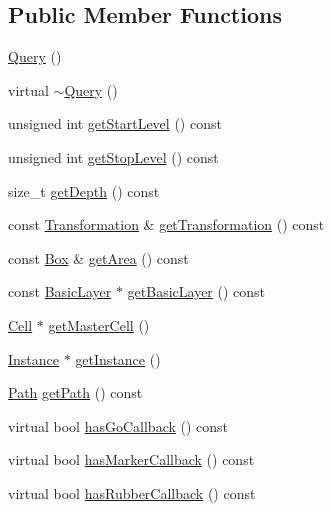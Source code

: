 \subsection*{Public Member Functions}
\begin{DoxyCompactItemize}
\item 
\hyperlink{classHurricane_1_1Query_a999eaaaf34672fb056df14629d3197d1}{Query} ()
\item 
virtual \hyperlink{classHurricane_1_1Query_acd18d98c6bf30dd049916508a397391a}{$\sim$\+Query} ()
\item 
unsigned int \hyperlink{classHurricane_1_1Query_a7aac7fbdc96df19e7249bf8993eb355f}{get\+Start\+Level} () const
\item 
unsigned int \hyperlink{classHurricane_1_1Query_a3544d22dbb0685208c590cef09412796}{get\+Stop\+Level} () const
\item 
size\+\_\+t \hyperlink{classHurricane_1_1Query_afb81080617e5b4d3c2bedf1bf8b2ebd8}{get\+Depth} () const
\item 
const \hyperlink{classHurricane_1_1Transformation}{Transformation} \& \hyperlink{classHurricane_1_1Query_aabe2c0588f95c30a3acfec8fed269be4}{get\+Transformation} () const
\item 
const \hyperlink{classHurricane_1_1Box}{Box} \& \hyperlink{classHurricane_1_1Query_a666c44432d3f5717f2fee5f57a281bdd}{get\+Area} () const
\item 
const \hyperlink{classHurricane_1_1BasicLayer}{Basic\+Layer} $\ast$ \hyperlink{classHurricane_1_1Query_ac683152bccef813184e572806e4c14f4}{get\+Basic\+Layer} () const
\item 
\hyperlink{classHurricane_1_1Cell}{Cell} $\ast$ \hyperlink{classHurricane_1_1Query_add13f7ff193df6ce5223f9761b6cba69}{get\+Master\+Cell} ()
\item 
\hyperlink{classHurricane_1_1Instance}{Instance} $\ast$ \hyperlink{classHurricane_1_1Query_a459b9f175f77fce91963eeb192c6e018}{get\+Instance} ()
\item 
\hyperlink{classHurricane_1_1Path}{Path} \hyperlink{classHurricane_1_1Query_ae6be93b35a9174b2e7b656853f450021}{get\+Path} () const
\item 
virtual bool \hyperlink{classHurricane_1_1Query_aeff0c9c1ef8b787a3f1460ea55db2947}{has\+Go\+Callback} () const
\item 
virtual bool \hyperlink{classHurricane_1_1Query_a4f121b05f722a661b88bb8a0dc981024}{has\+Marker\+Callback} () const
\item 
virtual bool \hyperlink{classHurricane_1_1Query_a5d49250d46dea1542bc3034f3eb1daee}{has\+Rubber\+Callback} () const

\end{DoxyCompactItemize}
